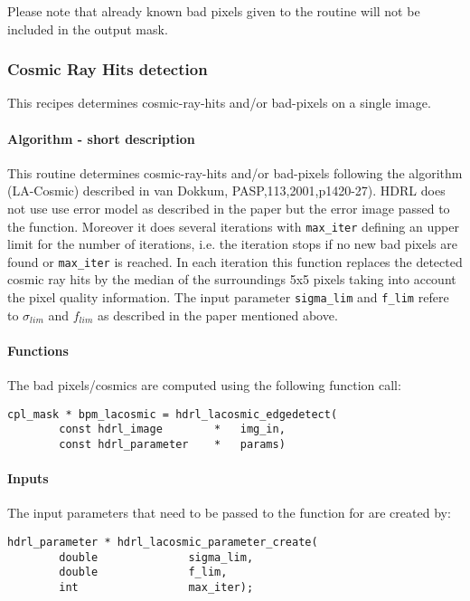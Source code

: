 Please note that already known bad pixels given to the routine will
not be included in the output mask.

\subsubsection{Cosmic Ray Hits detection}

This recipes determines cosmic-ray-hits and/or bad-pixels on a single
image.

\paragraph{Algorithm  - short description}

This routine determines cosmic-ray-hits and/or bad-pixels following
the algorithm (LA-Cosmic) described in van Dokkum,
PASP,113,2001,p1420-27). HDRL does not use use error model as described in
the paper but the error image passed to the function. Moreover it does
several iterations with \verb,max_iter, defining an upper limit for
the number of iterations, i.e. the iteration stops if no new bad
pixels are found or \verb,max_iter, is reached. In each iteration this function
replaces the detected cosmic ray hits by the median of the surroundings
5x5 pixels taking into account the pixel quality information. The
input parameter \verb,sigma_lim, and \verb,f_lim, refere to
$\sigma_{lim}$ and $f_{lim}$ as described in the paper mentioned
above.

\paragraph{Functions}

The bad pixels/cosmics are computed using the following function call:

\begin{lstlisting}
cpl_mask * bpm_lacosmic = hdrl_lacosmic_edgedetect(
        const hdrl_image        *   img_in,
        const hdrl_parameter    *   params)
\end{lstlisting}
                                                                      
\paragraph{Inputs}

The input parameters that need to be passed to the function for are
created by:

\begin{lstlisting}
hdrl_parameter * hdrl_lacosmic_parameter_create(
        double              sigma_lim,
        double              f_lim,
        int                 max_iter);
\end{lstlisting}

